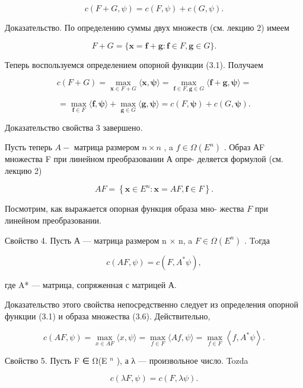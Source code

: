 \documentclass[8pt]{extarticle}
\begin{document}
\[
c\left( {F + G,\psi }\right)  = c\left( {F,\psi }\right)  + c\left( {G,\psi }\right) .
\]

Доказательство. По определению суммы двух множеств (см. лекцию 2) имеем

\[
F + G = \{ \mathbf{x} = \mathbf{f} + \mathbf{g} : \mathbf{f} \in  F,\mathbf{g} \in  G\} .
\]

Теперь воспользуемся определением опорной функции (3.1). Получаем

\[
c\left( {F + G}\right)  = \mathop{\max }\limits_{{\mathbf{x} \in  F + G}}\langle \mathbf{x},\mathbf{\psi }\rangle  = \mathop{\max }\limits_{{\mathbf{f} \in  F,\mathbf{g} \in  G}}\langle \mathbf{f} + \mathbf{g},\mathbf{\psi }\rangle  =
\]

\[
= \mathop{\max }\limits_{{\mathbf{f} \in  F}}\langle \mathbf{f},\mathbf{\psi }\rangle  + \mathop{\max }\limits_{{\mathbf{g} \in  G}}\langle \mathbf{g},\mathbf{\psi }\rangle  = c\left( {F,\mathbf{\psi }}\right)  + c\left( {G,\mathbf{\psi }}\right) .
\]

Доказательство свойства 3 завершено.

Пусть теперь \(A -\) матрица размером \(n \times  n\) , a \(f \in  \Omega \left( {E}^{n}\right)\) . Образ АF множества F при линейном преобразовании А опре- деляется формулой (см. лекцию 2)

\[
{AF} = \left\{  {\mathbf{x} \in  {E}^{n} : \mathbf{x} = {AF},\mathbf{f} \in  F}\right\}  . \tag{3.6}
\]

Посмотрим, как выражается опорная функция образа мно- жества \(F\) при линейном преобразовании.

Свойство 4. Пусть А — матрица размером n × n, a \(F \in  \Omega \left( {E}^{n}\right)\) . Toгда

\[
c\left( {{AF},\psi }\right)  = c\left( {F,{A}^{ * }\psi }\right) ,
\]

где A* — матрица, сопряженная с матрицей А.

Доказательство этого свойства непосредственно следует из определения опорной функции (3.1) и образа множества (3.6). Действительно,

\[
c\left( {{AF},\psi }\right)  = \mathop{\max }\limits_{{x \in  {AF}}}\langle x,\psi \rangle  = \mathop{\max }\limits_{{f \in  F}}\langle {Af},\psi \rangle  = \mathop{\max }\limits_{{f \in  F}}\left\langle  {f,{A}^{ * }\psi }\right\rangle  .
\]

Свойство 5. Пусть F ∈ Ω(E \({}^{n}\) ), а λ — произвольное число. Tozda

\[
c\left( {{\lambda F},\psi }\right)  = c\left( {F,{\lambda \psi }}\right) .
\]
\end{document}

